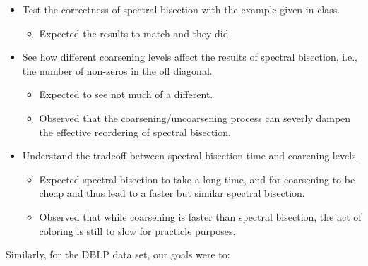 \documentclass[11pt]{article}
\newcommand{\noi}{\noindent}
\begin{document}
\begin{itemize}
	\item Test the correctness of spectral bisection with the example given in
		class. 
		\begin{itemize}
			\item Expected the results to match and they did.
		\end{itemize}
	\item See how different coarsening levels affect the results of spectral bisection,
		i.e., the number of non-zeros in the off diagonal. 
		\begin{itemize}
			\item Expected to see not much of a different. 
			\item Observed that the coarsening/uncoarsening process can
				severly dampen the effective reordering of
				spectral bisection.
		\end{itemize}
	\item Understand the tradeoff between spectral bisection time and
		coarening levels. 
		\begin{itemize}
			\item Expected spectral bisection to take a long time,
				and for coarsening to be cheap and thus lead to
				a faster but similar spectral bisection. 
			\item Observed that while coarsening is faster than
				spectral bisection, the act of coloring is still
				to slow for practicle purposes.
		\end{itemize}
\end{itemize}
\noi Similarly, for the DBLP data set, our goals were to: 
\end{document}
